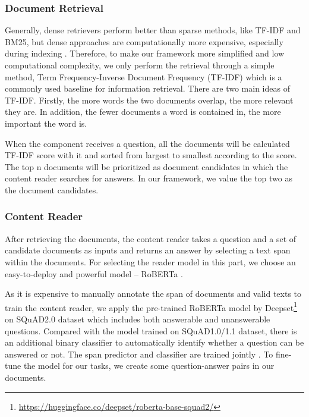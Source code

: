 \documentclass[11pt]{article}
\begin{document}
\subsubsection{Document Retrieval}\label{sec:CONTENT-BASED QA 1}
Generally, dense retrievers perform better than sparse methods, like TF-IDF and BM25, but dense approaches are computationally more expensive, especially during indexing \cite{c36}. Therefore, to make our framework more simplified and low computational complexity, we only perform the retrieval through a simple method, Term Frequency-Inverse Document Frequency (TF-IDF) which is a commonly used baseline for information retrieval. There are two main ideas of TF-IDF. Firstly, the more words the two documents overlap, the more relevant they are. In addition, the fewer documents a word is contained in, the more important the word is.

When the component receives a question, all the documents will be calculated TF-IDF score with it and sorted from largest to smallest according to the score. The top n documents will be prioritized as document candidates in which the content reader searches for answers. In our framework, we value the top two as the document candidates.

\subsubsection{Content Reader}\label{sec:CONTENT-BASED QA 1}
After retrieving the documents, the content reader takes a question and a set of candidate documents as inputs and returns an answer by selecting a text span within the documents. For selecting the reader model in this part, we choose an easy-to-deploy and powerful model -- RoBERTa \cite{c33}.


As it is expensive to manually annotate the span of documents and valid texts to train the content reader, we apply the pre-trained RoBERTa model by Deepset\footnote{\url{https://huggingface.co/deepset/roberta-base-squad2/}} on SQuAD2.0 dataset which includes both answerable and unanswerable questions. Compared with the model trained on SQuAD1.0/1.1 dataset, there is an additional binary classifier to automatically identify whether a question can be answered or not. The span predictor and classifier are trained jointly \cite{c33}. To fine-tune the model for our tasks, we create some question-answer pairs in our documents.
\end{document}
